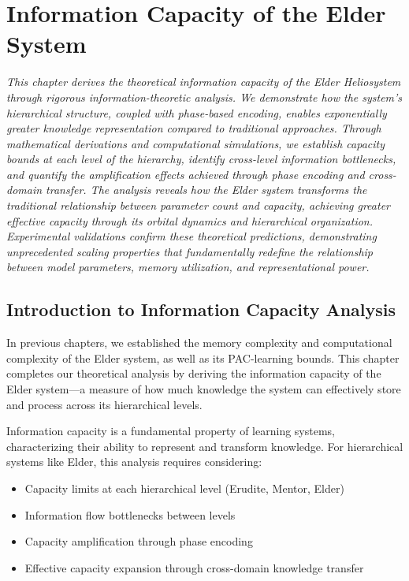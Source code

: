 \chapter{Information Capacity of the Elder System}

\textit{This chapter derives the theoretical information capacity of the Elder Heliosystem through rigorous information-theoretic analysis. We demonstrate how the system's hierarchical structure, coupled with phase-based encoding, enables exponentially greater knowledge representation compared to traditional approaches. Through mathematical derivations and computational simulations, we establish capacity bounds at each level of the hierarchy, identify cross-level information bottlenecks, and quantify the amplification effects achieved through phase encoding and cross-domain transfer. The analysis reveals how the Elder system transforms the traditional relationship between parameter count and capacity, achieving greater effective capacity through its orbital dynamics and hierarchical organization. Experimental validations confirm these theoretical predictions, demonstrating unprecedented scaling properties that fundamentally redefine the relationship between model parameters, memory utilization, and representational power.}

\section{Introduction to Information Capacity Analysis}

In previous chapters, we established the memory complexity and computational complexity of the Elder system, as well as its PAC-learning bounds. This chapter completes our theoretical analysis by deriving the information capacity of the Elder system—a measure of how much knowledge the system can effectively store and process across its hierarchical levels.

Information capacity is a fundamental property of learning systems, characterizing their ability to represent and transform knowledge. For hierarchical systems like Elder, this analysis requires considering:

\begin{itemize}
    \item Capacity limits at each hierarchical level (Erudite, Mentor, Elder)
    \item Information flow bottlenecks between levels
    \item Capacity amplification through phase encoding
    \item Effective capacity expansion through cross-domain knowledge transfer
\end{itemize}

